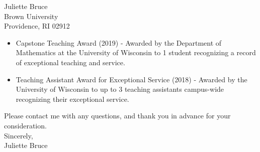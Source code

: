 \documentclass[11pt]{brownletter}
\begin{document}
\begin{letter}{Juliette Bruce\\ 
               Brown University\\ 
               Providence, RI 02912}
\begin{itemize}
\item Capstone Teaching Award (2019) - Awarded by the Department of Mathematics at the University of Wisconsin to 1 student recognizing a record of exceptional teaching and service.
\item Teaching Assistant Award for Exceptional Service  (2018) - Awarded by the University of Wisconsin to up to 3 teaching assistants campus-wide recognizing their exceptional service.

\end{itemize}

Please contact me with any questions, and thank you in advance for your consideration.
\vspace{.1 in}
\\
Sincerely,
\\
Juliette Bruce




\end{letter}
\end{document}
